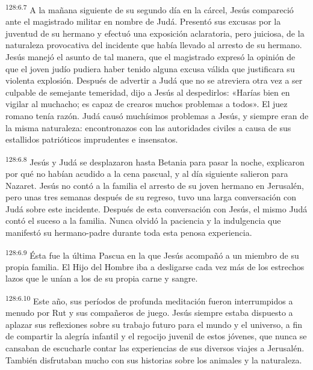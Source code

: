 \par
\textsuperscript{128:6.7} A la mañana siguiente de su segundo día en la cárcel, Jesús compareció ante el magistrado militar en nombre de Judá. Presentó sus excusas por la juventud de su hermano y efectuó una exposición aclaratoria, pero juiciosa, de la naturaleza provocativa del incidente que había llevado al arresto de su hermano. Jesús manejó el asunto de tal manera, que el magistrado expresó la opinión de que el joven judío pudiera haber tenido alguna excusa válida que justificara su violenta explosión. Después de advertir a Judá que no se atreviera otra vez a ser culpable de semejante temeridad, dijo a Jesús al despedirlos: «Harías bien en vigilar al muchacho; es capaz de crearos muchos problemas a todos». El juez romano tenía razón. Judá causó muchísimos problemas a Jesús, y siempre eran de la misma naturaleza: encontronazos con las autoridades civiles a causa de sus estallidos patrióticos imprudentes e insensatos.

\par
\textsuperscript{128:6.8} Jesús y Judá se desplazaron hasta Betania para pasar la noche, explicaron por qué no habían acudido a la cena pascual, y al día siguiente salieron para Nazaret. Jesús no contó a la familia el arresto de su joven hermano en Jerusalén, pero unas tres semanas después de su regreso, tuvo una larga conversación con Judá sobre este incidente. Después de esta conversación con Jesús, el mismo Judá contó el suceso a la familia. Nunca olvidó la paciencia y la indulgencia que manifestó su hermano-padre durante toda esta penosa experiencia.

\par
\textsuperscript{128:6.9} Ésta fue la última Pascua en la que Jesús acompañó a un miembro de su propia familia. El Hijo del Hombre iba a desligarse cada vez más de los estrechos lazos que le unían a los de su propia carne y sangre.

\par
\textsuperscript{128:6.10} Este año, sus períodos de profunda meditación fueron interrumpidos a menudo por Rut y sus compañeros de juego. Jesús siempre estaba dispuesto a aplazar sus reflexiones sobre su trabajo futuro para el mundo y el universo, a fin de compartir la alegría infantil y el regocijo juvenil de estos jóvenes, que nunca se cansaban de escucharle contar las experiencias de sus diversos viajes a Jerusalén. También disfrutaban mucho con sus historias sobre los animales y la naturaleza.

